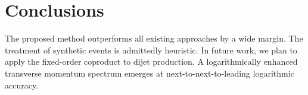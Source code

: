 \section{Conclusions}\label{sec:conclusions}

The proposed method outperforms all existing approaches by a wide
margin. The treatment of synthetic events is admittedly heuristic. In
future work, we plan to apply the fixed-order coproduct to dijet
production. A logarithmically enhanced transverse momentum spectrum
emerges at next-to-next-to-leading logarithmic accuracy.

